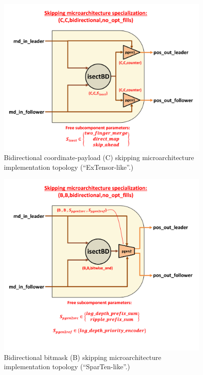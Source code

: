 \begin{figure}[H]
    \centering
    \includegraphics[width=0.95\textwidth]{figures/SKIP_C_C_bidirectional_no_opt_fills.png}
    \caption{Bidirectional coordinate-payload (C) skipping microarchitecture implementation topology (``ExTensor-like''\cite{extensor}.)}
    \label{fig:SKIP_C_C_bidirectional_no_opt_fills}
\end{figure}

\begin{figure}[H]
    \centering
    \includegraphics[width=0.95\textwidth]{figures/SKIP_B_B_bidirectional_no_opt_fills.png}
    \caption{Bidirectional bitmask (B) skipping microarchitecture implementation topology (``SparTen-like''\cite{sparten}.)}
    \label{fig:SKIP_B_B_bidirectional_no_opt_fills}
\end{figure}

